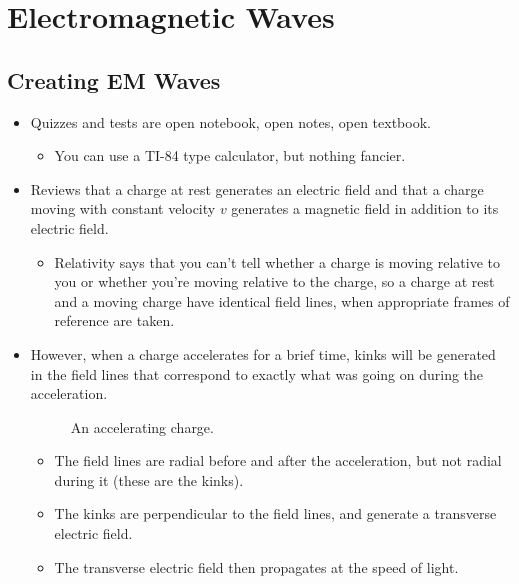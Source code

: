 \documentclass[../notes.tex]{subfiles}
\begin{document}
\chapter{Electromagnetic Waves}
\section{Creating EM Waves}
\begin{itemize}
    \item {}Quizzes and tests are open notebook, open notes, open textbook.
    \begin{itemize}
        \item You can use a TI-84 type calculator, but nothing fancier.
    \end{itemize}
    \item Reviews that a charge at rest generates an electric field and that a charge moving with constant velocity $v$ generates a magnetic field in addition to its electric field.
    \begin{itemize}
        \item Relativity says that you can't tell whether a charge is moving relative to you or whether you're moving relative to the charge, so a charge at rest and a moving charge have identical field lines, when appropriate frames of reference are taken.
    \end{itemize}
    \item However, when a charge accelerates for a brief time, kinks will be generated in the field lines that correspond to exactly what was going on during the acceleration.
    \begin{figure}[h!]
        \centering
        \caption{An accelerating charge.}
        \label{fig:acceleratingCharge}
    \end{figure}
    \begin{itemize}
        \item The field lines are radial before and after the acceleration, but not radial during it (these are the kinks).
        \item The kinks are perpendicular to the field lines, and generate a transverse electric field.
        \item The transverse electric field then propagates at the speed of light.
    \end{itemize}
\end{itemize}
\end{document}
